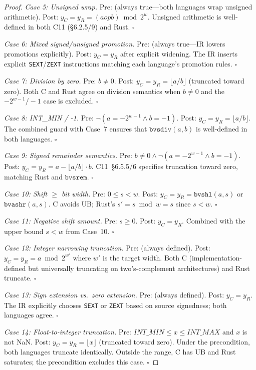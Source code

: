 \documentclass[10pt,a4paper]{article}
\begin{document}
\begin{appendices}
\begin{proof}
\emph{Case 5: Unsigned wrap.}
Pre: (always true---both languages wrap unsigned arithmetic).
Post: $y_C = y_R = (a \mathbin{op} b) \bmod 2^w$.
Unsigned arithmetic is well-defined in both C11 (\S6.2.5/9) and
Rust.  $\square$

\emph{Case 6: Mixed signed/unsigned promotion.}
Pre: (always true---IR lowers promotions explicitly).
Post: $y_C = y_R$ after explicit widening.
The IR inserts explicit \texttt{SEXT}/\texttt{ZEXT} instructions
matching each language's promotion rules.  $\square$

\emph{Case 7: Division by zero.}
Pre: $b \neq 0$.
Post: $y_C = y_R = \lfloor a / b \rfloor$ (truncated toward zero).
Both C and Rust agree on division semantics when $b \neq 0$ and the
$-2^{w-1}/-1$ case is excluded.  $\square$

\emph{Case 8: INT\_MIN / -1.}
Pre: $\neg(a = -2^{w-1} \wedge b = -1)$.
Post: $y_C = y_R = \lfloor a / b \rfloor$.
The combined guard with Case~7 ensures that
$\texttt{bvsdiv}(a,b)$ is well-defined in both languages.  $\square$

\emph{Case 9: Signed remainder semantics.}
Pre: $b \neq 0 \wedge \neg(a = -2^{w-1} \wedge b = -1)$.
Post: $y_C = y_R = a - \lfloor a/b \rfloor \cdot b$.
C11~\S6.5.5/6 specifies truncation toward zero, matching
Rust and $\texttt{bvsrem}$.  $\square$

\emph{Case 10: Shift $\geq$ bit width.}
Pre: $0 \leq s < w$.
Post: $y_C = y_R = \texttt{bvshl}(a, s)$ or
$\texttt{bvashr}(a, s)$.
C avoids UB; Rust's $s' = s \bmod w = s$ since $s < w$.  $\square$

\emph{Case 11: Negative shift amount.}
Pre: $s \geq 0$.
Post: $y_C = y_R$.
Combined with the upper bound $s < w$ from Case~10.  $\square$

\emph{Case 12: Integer narrowing truncation.}
Pre: (always defined).
Post: $y_C = y_R = a \bmod 2^{w'}$ where $w'$ is the target width.
Both C (implementation-defined but universally truncating on
two's-complement architectures) and Rust truncate.  $\square$

\emph{Case 13: Sign extension vs.\ zero extension.}
Pre: (always defined).
Post: $y_C = y_R$.
The IR explicitly chooses \texttt{SEXT} or \texttt{ZEXT} based on
source signedness; both languages agree.  $\square$

\emph{Case 14: Float-to-integer truncation.}
Pre: $\mathit{INT\_MIN} \leq x \leq \mathit{INT\_MAX}$ and $x$
is not NaN.
Post: $y_C = y_R = \lfloor x \rfloor$ (truncated toward zero).
Under the precondition, both languages truncate identically.
Outside the range, C has UB and Rust saturates; the precondition
excludes this case.  $\square$


\end{proof}
\end{appendices}
\end{document}
